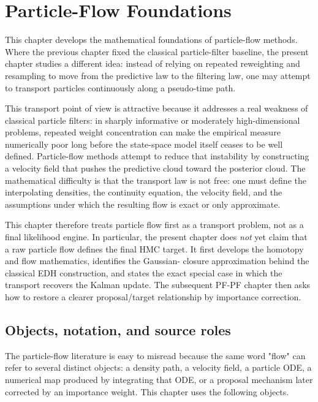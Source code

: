 \chapter{Particle-Flow Foundations}
\label{ch:bf-dpf-particle-flow-foundations}

This chapter develops the mathematical foundations of particle-flow methods.
Where the previous chapter fixed the classical particle-filter baseline, the
present chapter studies a different idea: instead of relying on repeated
reweighting and resampling to move from the predictive law to the filtering law,
one may attempt to transport particles continuously along a pseudo-time path.

This transport point of view is attractive because it addresses a real weakness
of classical particle filters: in sharply informative or moderately
high-dimensional problems, repeated weight concentration can make the empirical
measure numerically poor long before the state-space model itself ceases to be
well defined.  Particle-flow methods attempt to reduce that instability by
constructing a velocity field that pushes the predictive cloud toward the
posterior cloud.  The mathematical difficulty is that the transport law is not
free: one must define the interpolating densities, the continuity equation, the
velocity field, and the assumptions under which the resulting flow is exact or
only approximate.

This chapter therefore treats particle flow first as a transport problem, not
as a final likelihood engine.  In particular, the present chapter does
\emph{not} yet claim that a raw particle flow defines the final HMC target.  It
first develops the homotopy and flow mathematics, identifies the Gaussian-
closure approximation behind the classical EDH construction, and states the
exact special case in which the transport recovers the Kalman update.  The
subsequent PF-PF chapter then asks how to restore a clearer proposal/target
relationship by importance correction.

\section{Objects, notation, and source roles}
\label{sec:bf-pff-objects}

The particle-flow literature is easy to misread because the same word "flow"
can refer to several distinct objects: a density path, a velocity field, a
particle ODE, a numerical map produced by integrating that ODE, or a proposal
mechanism later corrected by an importance weight.  This chapter uses the
following objects.

